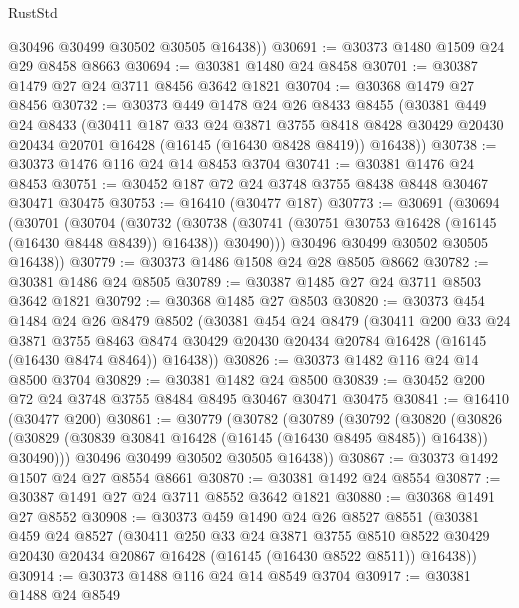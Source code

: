 \begin{lexlean}{RustStd}
\begin{coremodule}
        @30496
        @30499
        @30502
        @30505
        @16438))
@30691 := @30373 @1480 @1509 @24 @29 @8458 @8663
@30694 := @30381 @1480 @24 @8458
@30701 := @30387 @1479 @27 @24 @3711 @8456 @3642 @1821
@30704 := @30368 @1479 @27 @8456
@30732 := @30373
    @449
    @1478
    @24
    @26
    @8433
    @8455
    (@30381
      @449
      @24
      @8433
      (@30411
        @187
        @33
        @24
        @3871
        @3755
        @8418
        @8428
        @30429
        @20430
        @20434
        @20701
        @16428
        (@16145 (@16430 @8428 @8419))
        @16438))
@30738 := @30373 @1476 @116 @24 @14 @8453 @3704
@30741 := @30381 @1476 @24 @8453
@30751 := @30452 @187 @72 @24 @3748 @3755 @8438 @8448 @30467 @30471 @30475
@30753 := @16410 (@30477 @187)
@30773 := @30691
    (@30694
      (@30701
        (@30704
          (@30732
            (@30738 (@30741 (@30751 @30753 @16428 (@16145 (@16430 @8448 @8439)) @16438)) @30490)))
        @30496
        @30499
        @30502
        @30505
        @16438))
@30779 := @30373 @1486 @1508 @24 @28 @8505 @8662
@30782 := @30381 @1486 @24 @8505
@30789 := @30387 @1485 @27 @24 @3711 @8503 @3642 @1821
@30792 := @30368 @1485 @27 @8503
@30820 := @30373
    @454
    @1484
    @24
    @26
    @8479
    @8502
    (@30381
      @454
      @24
      @8479
      (@30411
        @200
        @33
        @24
        @3871
        @3755
        @8463
        @8474
        @30429
        @20430
        @20434
        @20784
        @16428
        (@16145 (@16430 @8474 @8464))
        @16438))
@30826 := @30373 @1482 @116 @24 @14 @8500 @3704
@30829 := @30381 @1482 @24 @8500
@30839 := @30452 @200 @72 @24 @3748 @3755 @8484 @8495 @30467 @30471 @30475
@30841 := @16410 (@30477 @200)
@30861 := @30779
    (@30782
      (@30789
        (@30792
          (@30820
            (@30826 (@30829 (@30839 @30841 @16428 (@16145 (@16430 @8495 @8485)) @16438)) @30490)))
        @30496
        @30499
        @30502
        @30505
        @16438))
@30867 := @30373 @1492 @1507 @24 @27 @8554 @8661
@30870 := @30381 @1492 @24 @8554
@30877 := @30387 @1491 @27 @24 @3711 @8552 @3642 @1821
@30880 := @30368 @1491 @27 @8552
@30908 := @30373
    @459
    @1490
    @24
    @26
    @8527
    @8551
    (@30381
      @459
      @24
      @8527
      (@30411
        @250
        @33
        @24
        @3871
        @3755
        @8510
        @8522
        @30429
        @20430
        @20434
        @20867
        @16428
        (@16145 (@16430 @8522 @8511))
        @16438))
@30914 := @30373 @1488 @116 @24 @14 @8549 @3704
@30917 := @30381 @1488 @24 @8549

\end{coremodule}
\end{lexlean}

